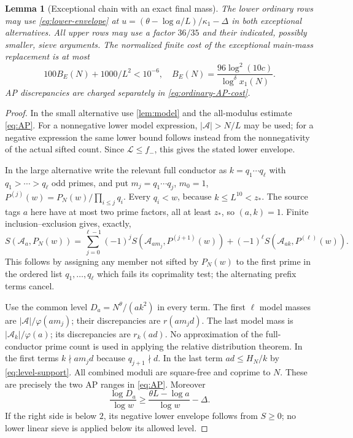 \documentclass[11pt]{article}
\newtheorem{lemma}[theorem]{Lemma}
\theoremstyle{definition}
\newcommand{\A}{\mathcal A}
\newcommand{\Flow}{\mathcal L}
\begin{document}
\begin{lemma}[Exceptional chain with an exact final mass]\label{lem:exceptional}
The lower ordinary rows may use \eqref{eq:lower-envelope} at
$u=(\theta-\log a/L)/\kappa_1-\Delta$ in both exceptional alternatives.
All upper rows may use a factor $36/35$ and their indicated, possibly
smaller, sieve arguments.  The normalized finite cost of the exceptional
main-mass replacement is at most
\begin{equation}\label{eq:exc-cost}
 100 B_E(N)+1000/L^2<10^{-6},
 \quad B_E(N)=\frac{96\log^2(10c)}{\log^\delta x_1(N)}.
\end{equation}
AP discrepancies are charged separately in \eqref{eq:ordinary-AP-cost}.
\end{lemma}
\begin{proof}
In the small alternative use \cref{lem:model} and the all-modulus
estimate \eqref{eq:AP}.  For a nonnegative lower model expression,
$|\A|>N/L$ may be used; for a negative expression the same lower
bound follows instead from the nonnegativity of the actual sifted count.
Since $\Flow\le f_-$, this gives the stated lower envelope.

In the large alternative write the relevant full conductor as
$k=q_1\cdots q_\ell$ with $q_1>\cdots>q_\ell$ odd primes, and put
$m_j=q_1\cdots q_j$, $m_0=1$, $P^{(j)}(w)=P_N(w)/\prod_{i\le j}q_i$.
Every $q_i<w$, because $k\le L^{10}<z_*$.  The source tags $a$ here
have at most two prime factors, all at least $z_*$, so $(a,k)=1$.
Finite inclusion--exclusion gives, exactly,
\begin{equation}\label{eq:chain-identity}
 S(\A_a,P_N(w))=
 \sum_{j=0}^{\ell-1}(-1)^jS(\A_{am_j},P^{(j+1)}(w))
 +(-1)^\ell S(\A_{ak},P^{(\ell)}(w)).
\end{equation}
This follows by assigning any member not sifted by $P_N(w)$ to the
first prime in the ordered list $q_1,\ldots,q_\ell$ which fails its
coprimality test; the alternating prefix terms cancel.

Use the common level $D_a=N^\theta/(ak^2)$ in every term.  The first
$\ell$ model masses are $|\A|/\varphi(am_j)$; their discrepancies
are $r(am_jd)$.  The last model mass is
$|\A_k|/\varphi(a)$; its discrepancies are $r_k(ad)$.  No approximation
of the full-conductor prime count is used in applying the relative
distribution theorem.  In the first terms $k\nmid am_jd$ because
$q_{j+1}\nmid d$.  In the last term $ad\le H_N/k$ by
\eqref{eq:level-support}.  All combined moduli are square-free and
coprime to $N$.  These are precisely the two AP ranges in \eqref{eq:AP}.
Moreover
\[
 \frac{\log D_a}{\log w}\ge
 \frac{\theta L-\log a}{\log w}-\Delta.
\]
If the right side is below $2$, its negative lower envelope follows
from $S\ge0$; no lower linear sieve is applied below its allowed level.


\end{proof}
\end{document}
